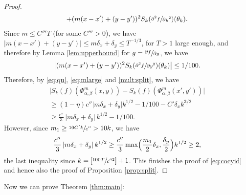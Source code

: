 \documentclass[JEP,XML,SOM,Unicode,NoEqCountersInSection]{cedram}
\theoremstyle{definition}
\theoremstyle{plain}
\begin{document}
\begin{proof}
\begin{multline*}
+(m(x-x')+(y-y'))^2
S_k(\sfrac{\partial^2 f}{\partial y^2})(\theta_k).
\end{multline*}
Since $m\leq C''' T$ (for some $C'''>0$), we have $\vert m(x-x')+(y-y')\vert \leq m\delta_x + \delta_y \leq T^{-1/3}$, for $T>1$ large enough, and therefore by Lemma \ref{lem:upperbound} for $g=\sfrac{\partial f}{\partial y}$, we have
\[
\bigl|(m(x-x')+(y-y'))^2
S_k(\sfrac{\partial^2 f}{\partial y^2})(\theta_k)\bigr|\leq 1/100.
\]
Therefore, by \eqref{eq:qu}, \eqref{eq:mlarge} and \eqref{mult:split}, we have\vspace*{-5pt}
\begin{multline*}
\bigl|S_{k}(f)(\Phi_{\alpha,\beta}^m(x,y))-S_{k}(f)(\Phi_{\alpha,\beta}^m(x',y'))\bigr| \\
\geq (1-\eta)c''\vert m\delta_x+\delta_y\vert k^{1/2}-1/100-C'\delta_x k^{3/2}\\
\geq
\frac{c''}{3}\,\vert m\delta_x+\delta_y\vert\, k^{1/2}-1/100.
\end{multline*}
However, since $m_1\geq \sfrac{10C'k}{c''} >10k$, we have
\[
\frac{c''}{3}\,\vert m\delta_x+\delta_y\vert\, k^{1/2}\geq \frac{c''}{3}\max\Bigl(\frac{m_1}{2}\delta_x,\frac{\delta_y}{2}\Bigr)k^{1/2} \geq 2,
\]
the last inequality since $k=[\sfrac{100T}{c''^2}]+1$. This finishes the proof of \eqref{eq:cocyid} and hence also the proof of Proposition \ref{prop:split}.
\end{proof}

Now we can prove Theorem \ref{thm:main}:
\end{document}
